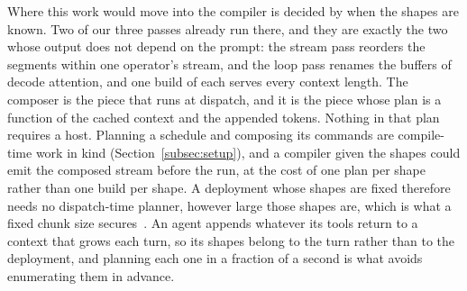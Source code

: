 \documentclass{article}
\begin{document}
Where this work would move into the compiler is decided by when the shapes are known.
Two of our three passes already run there, and they are exactly the two whose output does not depend on the prompt: the stream pass reorders the segments within one operator's stream, and the loop pass renames the buffers of decode attention, and one build of each serves every context length.
The composer is the piece that runs at dispatch, and it is the piece whose plan is a function of the cached context and the appended tokens.
Nothing in that plan requires a host.
Planning a schedule and composing its commands are compile-time work in kind (Section~\ref{subsec:setup}), and a compiler given the shapes could emit the composed stream before the run, at the cost of one plan per shape rather than one build per shape.
A deployment whose shapes are fixed therefore needs no dispatch-time planner, however large those shapes are, which is what a fixed chunk size secures~\citep{xu2025llmnpu}.
An agent appends whatever its tools return to a context that grows each turn, so its shapes belong to the turn rather than to the deployment, and planning each one in a fraction of a second is what avoids enumerating them in advance.




\end{document}
